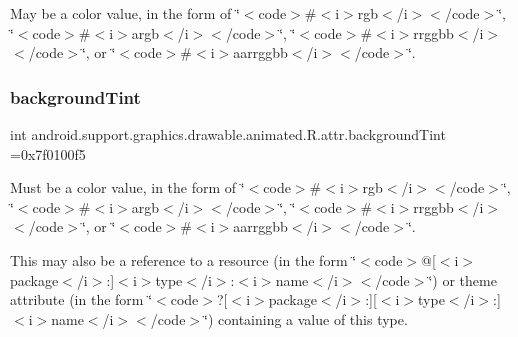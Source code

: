 May be a color value, in the form of \char`\"{}$<$code$>$\#$<$i$>$rgb$<$/i$>$$<$/code$>$\char`\"{}, \char`\"{}$<$code$>$\#$<$i$>$argb$<$/i$>$$<$/code$>$\char`\"{}, \char`\"{}$<$code$>$\#$<$i$>$rrggbb$<$/i$>$$<$/code$>$\char`\"{}, or \char`\"{}$<$code$>$\#$<$i$>$aarrggbb$<$/i$>$$<$/code$>$\char`\"{}. \mbox{\label{classandroid_1_1support_1_1graphics_1_1drawable_1_1animated_1_1R_1_1attr_aa7855b034b2fceddb7e91dc29163c1cf}} 
\subsubsection{\texorpdfstring{background\+Tint}{backgroundTint}}
{\footnotesize\ttfamily int android.\+support.\+graphics.\+drawable.\+animated.\+R.\+attr.\+background\+Tint =0x7f0100f5\hspace{0.3cm}{\ttfamily [static]}}

Must be a color value, in the form of \char`\"{}$<$code$>$\#$<$i$>$rgb$<$/i$>$$<$/code$>$\char`\"{}, \char`\"{}$<$code$>$\#$<$i$>$argb$<$/i$>$$<$/code$>$\char`\"{}, \char`\"{}$<$code$>$\#$<$i$>$rrggbb$<$/i$>$$<$/code$>$\char`\"{}, or \char`\"{}$<$code$>$\#$<$i$>$aarrggbb$<$/i$>$$<$/code$>$\char`\"{}. 

This may also be a reference to a resource (in the form \char`\"{}$<$code$>$@\mbox{[}$<$i$>$package$<$/i$>$\+:\mbox{]}$<$i$>$type$<$/i$>$\+:$<$i$>$name$<$/i$>$$<$/code$>$\char`\"{}) or theme attribute (in the form \char`\"{}$<$code$>$?\mbox{[}$<$i$>$package$<$/i$>$\+:\mbox{]}\mbox{[}$<$i$>$type$<$/i$>$\+:\mbox{]}$<$i$>$name$<$/i$>$$<$/code$>$\char`\"{}) containing a value of this type. \mbox{\label{classandroid_1_1support_1_1graphics_1_1drawable_1_1animated_1_1R_1_1attr_acc2fcfdb50e21b90ba79c4ec007a46d6}} 

